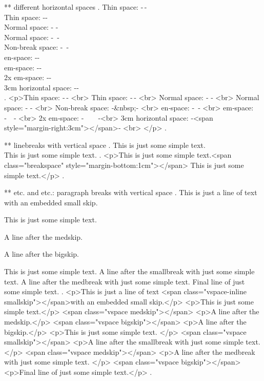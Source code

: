 ** different horizontal spaces
.
Thin space: -\,- \\
Thin space: -\thinspace- \\
Normal space: - - \\
Normal space: -\ - \\
Non-break space: -~- \\
en-space: -\enspace- \\
em-space: -\quad- \\
2x em-space: -\qquad-\\
3cm horizontal space: -\hspace{3cm}- \\
.
<p>Thin space: ‐ ‐ <br>
Thin space: ‐ ‐ <br>
Normal space: ‐ ‐ <br>
Normal space: ‐​ ‐ <br>
Non‐break space: ‐&nbsp;‐ <br>
en‐space: ‐ ‐ <br>
em‐space: ‐ ‐ <br>
2x em‐space: ‐  ‐<br>
3cm horizontal space: ‐<span style="margin-right:3cm"></span>‐ <br>
</p>
.


** linebreaks with vertical space
.
This is just some simple text.\\[1cm]
This is just some simple text.
.
<p>This is just some simple text.<span class="breakspace" style="margin-bottom:1cm"></span>
This is just some simple text.</p>
.


** \smallskip etc. and \smallbreak etc.: paragraph breaks with vertical space
.
This is just a line of text \smallskip with an embedded small skip.

This is just some simple text.

\medskip
A line after the medskip.

\bigskip

A line after the bigskip.

This is just some simple text.
\smallbreak
A line after the smallbreak with just some simple text.
\medbreak
A line after the medbreak with just some simple text.
\bigbreak
Final line of just some simple text.
.
<p>This is just a line of text <span class="vspace-inline smallskip"></span>with an embedded small skip.</p>
<p>This is just some simple text.</p>
<span class="vspace medskip"></span>
<p>A line after the medskip.</p>
<span class="vspace bigskip"></span>
<p>A line after the bigskip.</p>
<p>This is just some simple text. </p>
<span class="vspace smallskip"></span>
<p>A line after the smallbreak with just some simple text. </p>
<span class="vspace medskip"></span>
<p>A line after the medbreak with just some simple text. </p>
<span class="vspace bigskip"></span>
<p>Final line of just some simple text.</p>
.
